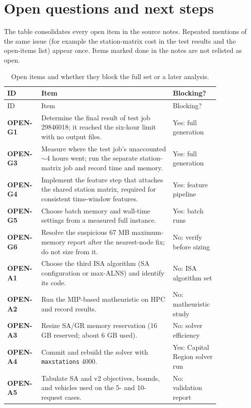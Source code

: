 \section{Open questions and next steps}

The table consolidates every open item in the source notes. Repeated mentions
of the same issue (for example the station-matrix cost in the test results and
the open-items list) appear once. Items marked done in the notes are not
relisted as open.

\begin{longtable}{@{}p{0.12\linewidth}p{0.58\linewidth}p{0.17\linewidth}@{}}
\caption{Open items and whether they block the full set or a later analysis.}\\
\toprule
ID & Item & Blocking?\\
\midrule
\endfirsthead
\toprule
ID & Item & Blocking?\\
\midrule
\endhead
\textbf{OPEN-G1} & Determine the final result of test job 29846018; it reached the six-hour limit with no output files. & Yes: full generation\\
\textbf{OPEN-G3} & Measure where the test job's unaccounted \(\sim\)4 hours went; run the separate station-matrix job and record time and memory. & Yes: full generation\\
\textbf{OPEN-G4} & Implement the feature step that attaches the shared station matrix, required for consistent time-window features. & Yes: feature pipeline\\
\textbf{OPEN-G5} & Choose batch memory and wall-time settings from a measured full instance. & Yes: batch runs\\
\textbf{OPEN-G6} & Resolve the suspicious 67 MB maximum-memory report after the nearest-node fix; do not size from it. & No: verify before sizing\\
\textbf{OPEN-A1} & Choose the third ISA algorithm (SA configuration or max-ALNS) and identify its code. & No: ISA algorithm set\\
\textbf{OPEN-A2} & Run the MIP-based matheuristic on HPC and record results. & No: matheuristic study\\
\textbf{OPEN-A3} & Resize SA/GR memory reservation (16 GB reserved; about 6 GB used). & No: solver efficiency\\
\textbf{OPEN-A4} & Commit and rebuild the solver with \texttt{maxstations} 4000. & Yes: Capital Region solver run\\
\textbf{OPEN-A5} & Tabulate SA and v2 objectives, bounds, and vehicles used on the 5- and 10-request cases. & No: validation report\\

\end{longtable}
